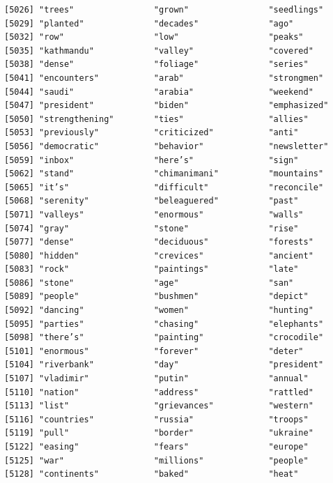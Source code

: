 \documentclass[
  letterpaper,
  DIV=11,
  numbers=noendperiod]{scrartcl}
\begin{document}
\begin{verbatim}
[5026] "trees"                "grown"                "seedlings"           
[5029] "planted"              "decades"              "ago"                 
[5032] "row"                  "low"                  "peaks"               
[5035] "kathmandu"            "valley"               "covered"             
[5038] "dense"                "foliage"              "series"              
[5041] "encounters"           "arab"                 "strongmen"           
[5044] "saudi"                "arabia"               "weekend"             
[5047] "president"            "biden"                "emphasized"          
[5050] "strengthening"        "ties"                 "allies"              
[5053] "previously"           "criticized"           "anti"                
[5056] "democratic"           "behavior"             "newsletter"          
[5059] "inbox"                "here’s"               "sign"                
[5062] "stand"                "chimanimani"          "mountains"           
[5065] "it’s"                 "difficult"            "reconcile"           
[5068] "serenity"             "beleaguered"          "past"                
[5071] "valleys"              "enormous"             "walls"               
[5074] "gray"                 "stone"                "rise"                
[5077] "dense"                "deciduous"            "forests"             
[5080] "hidden"               "crevices"             "ancient"             
[5083] "rock"                 "paintings"            "late"                
[5086] "stone"                "age"                  "san"                 
[5089] "people"               "bushmen"              "depict"              
[5092] "dancing"              "women"                "hunting"             
[5095] "parties"              "chasing"              "elephants"           
[5098] "there’s"              "painting"             "crocodile"           
[5101] "enormous"             "forever"              "deter"               
[5104] "riverbank"            "day"                  "president"           
[5107] "vladimir"             "putin"                "annual"              
[5110] "nation"               "address"              "rattled"             
[5113] "list"                 "grievances"           "western"             
[5116] "countries"            "russia"               "troops"              
[5119] "pull"                 "border"               "ukraine"             
[5122] "easing"               "fears"                "europe"              
[5125] "war"                  "millions"             "people"              
[5128] "continents"           "baked"                "heat"                

\end{verbatim}
\end{document}
